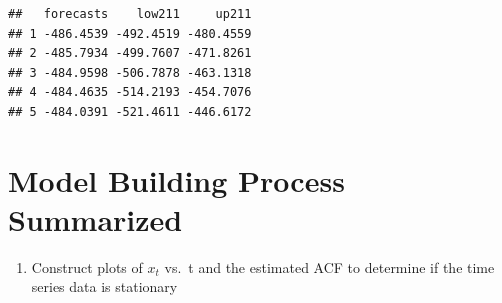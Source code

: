 \documentclass[
]{book}
\newenvironment{Shaded}{\begin{snugshade}}{\end{snugshade}}
\newcommand{\AttributeTok}[1]{\textcolor[rgb]{0.77,0.63,0.00}{#1}}
\newcommand{\CommentTok}[1]{\textcolor[rgb]{0.56,0.35,0.01}{\textit{#1}}}
\newcommand{\DecValTok}[1]{\textcolor[rgb]{0.00,0.00,0.81}{#1}}
\newcommand{\FloatTok}[1]{\textcolor[rgb]{0.00,0.00,0.81}{#1}}
\newcommand{\FunctionTok}[1]{\textcolor[rgb]{0.00,0.00,0.00}{#1}}
\newcommand{\NormalTok}[1]{#1}
\newcommand{\OtherTok}[1]{\textcolor[rgb]{0.56,0.35,0.01}{#1}}
\newcommand{\SpecialCharTok}[1]{\textcolor[rgb]{0.00,0.00,0.00}{#1}}
\providecommand{\tightlist}{%
  \setlength{\itemsep}{0pt}\setlength{\parskip}{0pt}}
\theoremstyle{definition}
\theoremstyle{definition}
\theoremstyle{definition}
\theoremstyle{definition}
\theoremstyle{remark}
\begin{document}
\begin{Shaded}
\end{Shaded}

\begin{verbatim}
##   forecasts    low211     up211
## 1 -486.4539 -492.4519 -480.4559
## 2 -485.7934 -499.7607 -471.8261
## 3 -484.9598 -506.7878 -463.1318
## 4 -484.4635 -514.2193 -454.7076
## 5 -484.0391 -521.4611 -446.6172
\end{verbatim}

\hypertarget{model-building-process-summarized}{%
\section{Model Building Process Summarized}\label{model-building-process-summarized}}

\begin{enumerate}
\def\labelenumi{\arabic{enumi}.}
\tightlist
\item
  Construct plots of \(x_t\) vs.~t and the estimated ACF to determine if the time series data is stationary
\end{enumerate}
\end{document}
